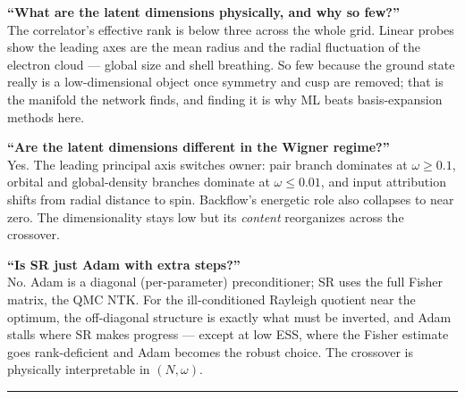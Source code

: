 \documentclass[11pt]{article}
\begin{document}
\begin{anticipate}
\textbf{``What are the latent dimensions physically, and why so few?''}\\
The correlator's effective rank is below three across the whole grid. Linear probes show the leading
axes are the mean radius and the radial fluctuation of the electron cloud --- global size and shell
breathing. So few because the ground state really is a low-dimensional object once symmetry and cusp
are removed; that is the manifold the network finds, and finding it is why ML beats basis-expansion
methods here.
\end{anticipate}

\begin{anticipate}
\textbf{``Are the latent dimensions different in the Wigner regime?''}\\
Yes. The leading principal axis switches owner: pair branch dominates at $\omega\ge0.1$, orbital and
global-density branches dominate at $\omega\le0.01$, and input attribution shifts from radial distance
to spin. Backflow's energetic role also collapses to near zero. The dimensionality stays low but its
\emph{content} reorganizes across the crossover.
\end{anticipate}

\begin{anticipate}
\textbf{``Is SR just Adam with extra steps?''}\\
No. Adam is a diagonal (per-parameter) preconditioner; SR uses the full Fisher matrix, the QMC NTK.
For the ill-conditioned Rayleigh quotient near the optimum, the off-diagonal structure is exactly what
must be inverted, and Adam stalls where SR makes progress --- except at low ESS, where the Fisher
estimate goes rank-deficient and Adam becomes the robust choice. The crossover is physically
interpretable in $(N,\omega)$.
\end{anticipate}

\vspace{1em}\hrule\vspace{1em}
\end{document}
